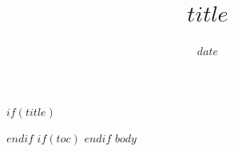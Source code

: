 \documentclass[11pt,a4paper]{article}
\title{$title$}
\date{$date$}
\begin{document}
$if(title)$
\maketitle
$endif$
$if(toc)$
\tableofcontents
\newpage
$endif$
$body$
\end{document}
